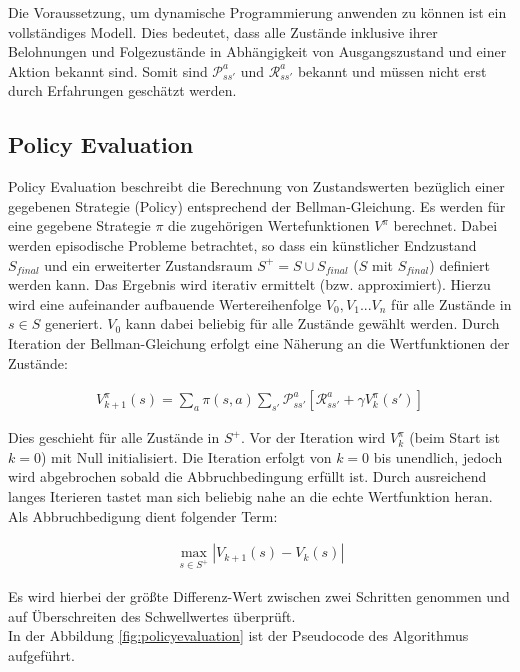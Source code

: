 \documentclass[10pt]{scrartcl}
\begin{document}
Die Voraussetzung, um dynamische Programmierung anwenden zu können ist ein vollständiges Modell. Dies bedeutet, dass alle Zustände inklusive ihrer Belohnungen und Folgezustände in Abhängigkeit von Ausgangszustand und einer Aktion bekannt sind.
Somit sind $\mathcal{P}^{a}_{ss'}$ und $\mathcal{R}^{a}_{ss'}$ bekannt und müssen nicht erst durch Erfahrungen geschätzt werden.

\subsection{Policy Evaluation}
Policy Evaluation beschreibt die Berechnung von Zustandswerten bezüglich einer gegebenen Strategie (Policy) entsprechend der Bellman-Gleichung. Es werden für eine gegebene Strategie $\pi$ die zugehörigen Wertefunktionen $V^{\pi}$ berechnet. Dabei werden episodische Probleme betrachtet, so dass ein künstlicher Endzustand $S_{final}$  und ein erweiterter Zustandsraum $S^+=S\cup{S_{final}}$ ($S$ mit $S_{final}$) definiert werden kann. Das Ergebnis wird iterativ ermittelt (bzw. approximiert). Hierzu wird eine aufeinander aufbauende Wertereihenfolge $V_0, V_1 ... V_n$ für alle Zustände in $s \in S$ generiert. $V_0$ kann dabei beliebig für alle Zustände  gewählt werden. Durch Iteration der Bellman-Gleichung erfolgt eine Näherung an die Wertfunktionen der Zustände:

\begin{align}
V^\pi_{k+1}(s) = \sum\limits_{a} \pi(s,a) \sum\limits_{s'}\mathcal{P}^a_{ss'}[\mathcal{R}^a_{ss'}+\gamma V^\pi_k(s')]
\end{align}

Dies geschieht für alle Zustände in $S^+$. Vor der Iteration wird $V^\pi_k$  (beim Start ist $k=0$) mit Null initialisiert. Die Iteration erfolgt von $k=0$ bis unendlich, jedoch wird abgebrochen sobald die  Abbruchbedingung erfüllt ist. Durch ausreichend langes Iterieren tastet man sich beliebig nahe an die echte Wertfunktion heran. Als Abbruchbedigung dient folgender Term:

\begin{align}
\max\limits_{s\in S^+} |V_{k+1}(s)-V_k(s)|
\end{align}

Es wird hierbei der größte Differenz-Wert zwischen zwei Schritten genommen und  auf Überschreiten des Schwellwertes überprüft.\\
In der Abbildung \ref{fig:policyevaluation} ist der Pseudocode des Algorithmus aufgeführt.
\end{document}
